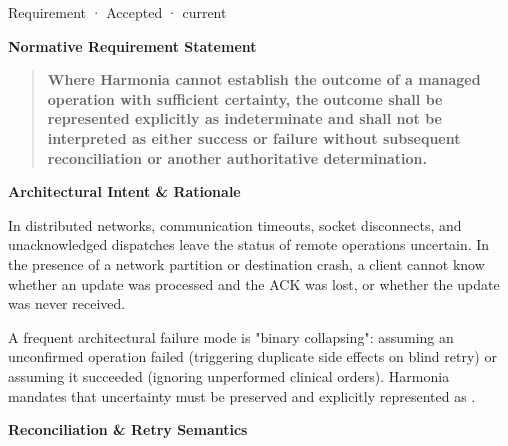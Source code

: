 \label{element:fc732b64fc564127b73174e28d9ccce8}
{\small Requirement · Accepted · current}\par

\par\medskip\textbf{Normative Requirement Statement}\par


\begin{quote}


\textbf{Where Harmonia cannot establish the outcome of a managed operation with sufficient certainty, the outcome shall be represented explicitly as indeterminate and shall not be interpreted as either success or failure without subsequent reconciliation or another authoritative determination.}



\end{quote}


\par\medskip\textbf{Architectural Intent \& Rationale}\par


In distributed networks, communication timeouts, socket disconnects, and unacknowledged dispatches leave the status of remote operations uncertain. In the presence of a network partition or destination crash, a client cannot know whether an update was processed and the ACK was lost, or whether the update was never received.



A frequent architectural failure mode is "binary collapsing": assuming an unconfirmed operation failed (triggering duplicate side effects on blind retry) or assuming it succeeded (ignoring unperformed clinical orders). Harmonia mandates that uncertainty must be preserved and explicitly represented as \texttt{}.



\par\medskip\textbf{Reconciliation \& Retry Semantics}\par


